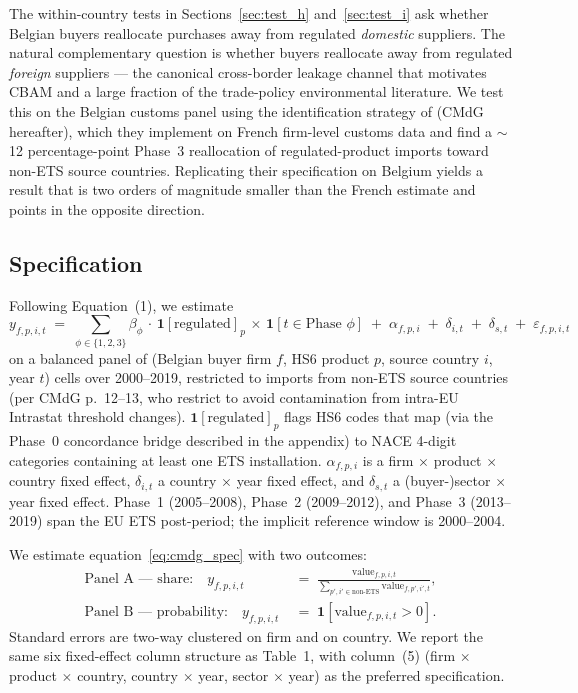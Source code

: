 The within-country tests in Sections~\ref{sec:test_h} and~\ref{sec:test_i} ask whether Belgian buyers reallocate purchases away from regulated \emph{domestic} suppliers. The natural complementary question is whether buyers reallocate away from regulated \emph{foreign} suppliers --- the canonical cross-border leakage channel that motivates CBAM and a large fraction of the trade-policy environmental literature. We test this on the Belgian customs panel using the identification strategy of \citet{CosterMejeanDiGiovanni2024} (CMdG hereafter), which they implement on French firm-level customs data and find a $\sim$12 percentage-point Phase~3 reallocation of regulated-product imports toward non-ETS source countries. Replicating their specification on Belgium yields a result that is two orders of magnitude smaller than the French estimate and points in the opposite direction.

\subsection{Specification}\label{sec:across:spec}

Following \citet{CosterMejeanDiGiovanni2024} Equation~(1), we estimate
\begin{equation}
    y_{f,p,i,t} \;=\; \sum_{\phi \in \{1, 2, 3\}} \beta_\phi \,\cdot\, \mathbf{1}[\text{regulated}]_p \,\times\, \mathbf{1}[t \in \text{Phase } \phi] \;+\; \alpha_{f,p,i} \;+\; \delta_{i,t} \;+\; \delta_{s,t} \;+\; \varepsilon_{f,p,i,t}
    \label{eq:cmdg_spec}
\end{equation}
on a balanced panel of (Belgian buyer firm $f$, HS6 product $p$, source country $i$, year $t$) cells over 2000--2019, restricted to imports from non-ETS source countries (per CMdG p.~12--13, who restrict to avoid contamination from intra-EU Intrastat threshold changes). $\mathbf{1}[\text{regulated}]_p$ flags HS6 codes that map (via the Phase~0 concordance bridge described in the appendix) to NACE 4-digit categories containing at least one ETS installation. $\alpha_{f,p,i}$ is a firm $\times$ product $\times$ country fixed effect, $\delta_{i,t}$ a country $\times$ year fixed effect, and $\delta_{s,t}$ a (buyer-)sector $\times$ year fixed effect. Phase~1 (2005--2008), Phase~2 (2009--2012), and Phase~3 (2013--2019) span the EU ETS post-period; the implicit reference window is 2000--2004.

We estimate equation~\eqref{eq:cmdg_spec} with two outcomes:
\begin{align*}
    \text{Panel A — share:} \quad y_{f,p,i,t} &\;=\; \frac{\text{value}_{f,p,i,t}}{\sum_{p',i' \in \text{non-ETS}} \text{value}_{f,p',i',t}}, \\
    \text{Panel B — probability:} \quad y_{f,p,i,t} &\;=\; \mathbf{1}[\text{value}_{f,p,i,t} > 0].
\end{align*}
Standard errors are two-way clustered on firm and on country. We report the same six fixed-effect column structure as \citet{CosterMejeanDiGiovanni2024} Table~1, with column~(5) (firm $\times$ product $\times$ country, country $\times$ year, sector $\times$ year) as the preferred specification.

